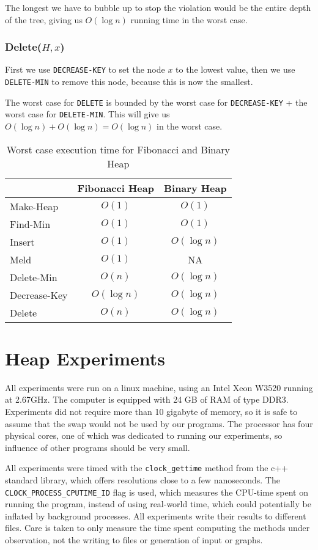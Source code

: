 \documentclass[a4paper,10pt]{article}
\begin{document}
The longest we have to bubble up to stop the violation would be the entire depth of the tree, giving us $O(\log n)$ running time in the worst case.
\subsubsection*{Delete($H, x$)}
First we use \texttt{DECREASE-KEY} to set the node $x$ to the lowest value, then we use \texttt{DELETE-MIN} to remove this node, because this is now the smallest.

The worst case for \texttt{DELETE} is bounded by the worst case for \texttt{DECREASE-KEY} + the worst case for \texttt{DELETE-MIN}. This will give us $O(\log n) + O(\log n) = O(\log n)$ in the worst case.

\begin{table}
  \begin{center}
    \begin{tabular}{l|c|c}
      & Fibonacci Heap & Binary Heap \\
      \hline
      Make-Heap    & $O(1)$             & $O(1)$\\
      Find-Min     & $O(1)$             & $O(1)$\\
      Insert       & $O(1)$             & $O(\log n)$\\
      Meld         & $O(1)$             & NA\\
      Delete-Min   & $O(n)$             & $O(\log n)$\\
      Decrease-Key & $O(\log n)$        & $O(\log n)$\\
      Delete       & $O(n)$             & $O(\log n)$
    \end{tabular}
    \caption{Worst case execution time for Fibonacci and Binary Heap}
  \end{center}
\end{table}
\section{Heap Experiments}
All experiments were run on a linux machine, using an Intel Xeon W3520 running at 2.67GHz. The computer is equipped with 24 GB of RAM of type DDR3. Experiments did not require more than 10 gigabyte of memory, so it is safe to assume that the swap would not be used by our programs. The processor has four physical cores, one of which was dedicated to running our experiments, so influence of other programs should be very small.

All experiments were timed with the \texttt{clock\_gettime} method from the c++ standard library, which offers resolutions close to a few nanoseconds. The \texttt{CLOCK\_PROCESS\_CPUTIME\_ID} flag is used, which measures the CPU-time spent on running the program, instead of using real-world time, which could potentially be inflated by background processes.
All experiments write their results to different files. Care is taken to only measure the time spent computing the methods under observation, not the writing to files or generation of input or graphs.
\end{document}
